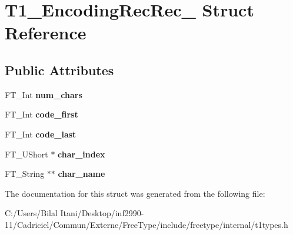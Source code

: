 \hypertarget{struct_t1___encoding_rec_rec__}{}\section{T1\+\_\+\+Encoding\+Rec\+Rec\+\_\+ Struct Reference}
\label{struct_t1___encoding_rec_rec__}
\subsection*{Public Attributes}
\begin{DoxyCompactItemize}
\item 
F\+T\+\_\+\+Int {\bfseries num\+\_\+chars}\hypertarget{struct_t1___encoding_rec_rec___af1468d5bad99cccebeb0387713999e9c}{}\label{struct_t1___encoding_rec_rec___af1468d5bad99cccebeb0387713999e9c}

\item 
F\+T\+\_\+\+Int {\bfseries code\+\_\+first}\hypertarget{struct_t1___encoding_rec_rec___ae21aad8cbb10c8fd94e9f30c60542662}{}\label{struct_t1___encoding_rec_rec___ae21aad8cbb10c8fd94e9f30c60542662}

\item 
F\+T\+\_\+\+Int {\bfseries code\+\_\+last}\hypertarget{struct_t1___encoding_rec_rec___a9be1faadf0ce11d12d3bce600e1f2a9d}{}\label{struct_t1___encoding_rec_rec___a9be1faadf0ce11d12d3bce600e1f2a9d}

\item 
F\+T\+\_\+\+U\+Short $\ast$ {\bfseries char\+\_\+index}\hypertarget{struct_t1___encoding_rec_rec___a0c00a7b5c5ec7ba5eba667252f11f199}{}\label{struct_t1___encoding_rec_rec___a0c00a7b5c5ec7ba5eba667252f11f199}

\item 
F\+T\+\_\+\+String $\ast$$\ast$ {\bfseries char\+\_\+name}\hypertarget{struct_t1___encoding_rec_rec___acf21f77cff90336fb9f297799aaf26eb}{}\label{struct_t1___encoding_rec_rec___acf21f77cff90336fb9f297799aaf26eb}

\end{DoxyCompactItemize}


The documentation for this struct was generated from the following file\+:\begin{DoxyCompactItemize}
\item 
C\+:/\+Users/\+Bilal Itani/\+Desktop/inf2990-\/11/\+Cadriciel/\+Commun/\+Externe/\+Free\+Type/include/freetype/internal/t1types.\+h\end{DoxyCompactItemize}
